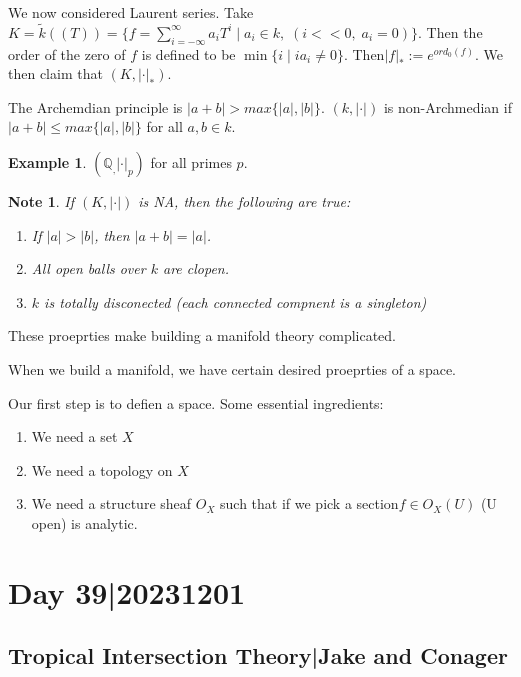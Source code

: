 \documentclass[12pt]{memoir}
\newtheorem{note}{Note}
\theoremstyle{definition}
\newtheorem{protoexample}{Example}[section]
\newenvironment{ex}
   {\begin{protoexample}}
   {\end{protoexample}}
\def\QQ{{\mathbb Q}}
\begin{document}
We now considered Laurent series. Take $K =\tilde{k}((T)) = \{ f = \sum\limits_{i=-\infty}^\infty a_iT^i \; |\; a_i \in k, \;(i<<0, \; a_i=0) \}$. Then the order of the zero of $f$ is defined to be $\min\{i \; |\; ia_i \neq 0\}$.  Then$ |f|_* :=e^{ord_0(f)}$. We then claim that $(K,|\cdot|_*)$.



The Archemdian principle is $|a+b| > max\{|a|, |b|\}$. $(k, |\cdot|)$ is non-Archmedian if $|a+b| \leq max\{|a|, |b|\}$ for all $a,b\in k$. 


\begin{ex}
    $(\QQ_,|\cdot|_p)$ for all primes $p$.
\end{ex}



\begin{note}
    If $(K, |\cdot|)$ is NA, then the following are true:

    \begin{enumerate}
        \item If $|a|>|b|$, then $|a+b|=|a|$.
        \item All open balls over $k$ are clopen.
        \item $k$ is totally disconected (each connected compnent is a singleton)
    \end{enumerate}
\end{note}

These proeprties make building a manifold theory complicated. 

When we build a manifold, we have certain desired proeprties of a space.

Our first step is to defien a space. Some essential ingredients:
\begin{enumerate}
    \item We need a set $X$
    \item We need a topology on $X$
    \item We need a structure sheaf $O_X$ such that if we pick a section$ f\in O_X(U)$ (U open) is analytic.
\end{enumerate}




\section{Day 39|20231201}

\subsection{Tropical Intersection Theory|Jake and Conager}
\end{document}

